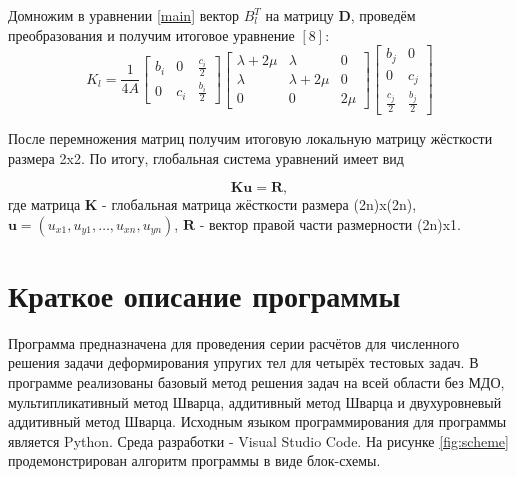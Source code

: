 \documentclass[a4paper, 14pt]{extarticle}
\begin{document}
Домножим в уравнении \ref{main} вектор $B_l^T$ на матрицу $\mathbf{D}$, проведём преобразования и получим итоговое уравнение $\left[8\right]$:
\begin{equation}
K_l = \frac{1}{4A}
\begin{bmatrix}
b_i & 0 & \frac{c_i}{2}\\ 
0 & c_i & \frac{b_i}{2}
\end{bmatrix}
\begin{bmatrix}
\lambda + 2\mu & \lambda & 0 \\ 
\lambda & \lambda + 2\mu & 0 \\ 
0 & 0 & 2\mu 
\end{bmatrix}
\begin{bmatrix}
b_j & 0 \\
0 & c_j \\
\frac{c_j}{2} & \frac{b_j}{2}
\end{bmatrix}
\end{equation}

\newpage

После перемножения матриц получим итоговую локальную матрицу жёсткости размера 2x2. По итогу, глобальная система уравнений имеет вид

\begin{equation}
\mathbf{Ku} = \mathbf{R},
\end{equation}
где матрица $\mathbf{K}$ - глобальная матрица жёсткости размера (2n)x(2n), $\mathbf{u} = (u_{x1}, u_{y1}, \ldots, u_{xn}, u_{yn})$, $\mathbf{R}$ - вектор правой части размерности (2n)x1.
\newpage

\section{Краткое описание программы}

Программа предназначена для проведения серии расчётов для численного решения задачи деформирования упругих тел для четырёх тестовых задач. В программе реализованы базовый метод решения задач на всей области без МДО, мультипликативный метод Шварца, аддитивный метод Шварца и двухуровневый аддитивный метод Шварца. Исходным языком программирования для программы является Python. Среда разработки - Visual Studio Code. На рисунке \ref{fig:scheme} продемонстрирован алгоритм программы в виде блок-схемы. 
\end{document}
